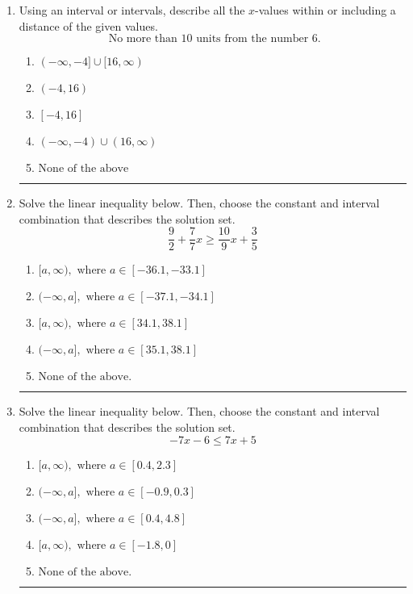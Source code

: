 \documentclass[14pt]{extbook}
\newcommand{\litem}[1]{\item#1\hspace*{-1cm}\rule{\textwidth}{0.4pt}}
\begin{document}
\begin{enumerate}
{\begin{enumerate}[label=\Alph*.]
\end{enumerate} }
\litem{
Using an interval or intervals, describe all the $x$-values within or including a distance of the given values.\[ \text{ No more than } 10 \text{ units from the number } 6. \]\begin{enumerate}[label=\Alph*.]
\item \( (-\infty, -4] \cup [16, \infty) \)
\item \( (-4, 16) \)
\item \( [-4, 16] \)
\item \( (-\infty, -4) \cup (16, \infty) \)
\item \( \text{None of the above} \)

\end{enumerate} }
\litem{
Solve the linear inequality below. Then, choose the constant and interval combination that describes the solution set.\[ \frac{9}{2} + \frac{7}{7} x \geq \frac{10}{9} x + \frac{3}{5} \]\begin{enumerate}[label=\Alph*.]
\item \( [a, \infty), \text{ where } a \in [-36.1, -33.1] \)
\item \( (-\infty, a], \text{ where } a \in [-37.1, -34.1] \)
\item \( [a, \infty), \text{ where } a \in [34.1, 38.1] \)
\item \( (-\infty, a], \text{ where } a \in [35.1, 38.1] \)
\item \( \text{None of the above}. \)

\end{enumerate} }
\litem{
Solve the linear inequality below. Then, choose the constant and interval combination that describes the solution set.\[ -7x -6 \leq 7x + 5 \]\begin{enumerate}[label=\Alph*.]
\item \( [a, \infty), \text{ where } a \in [0.4, 2.3] \)
\item \( (-\infty, a], \text{ where } a \in [-0.9, 0.3] \)
\item \( (-\infty, a], \text{ where } a \in [0.4, 4.8] \)
\item \( [a, \infty), \text{ where } a \in [-1.8, 0] \)
\item \( \text{None of the above}. \)

\end{enumerate} }
\end{enumerate}
\end{document}

